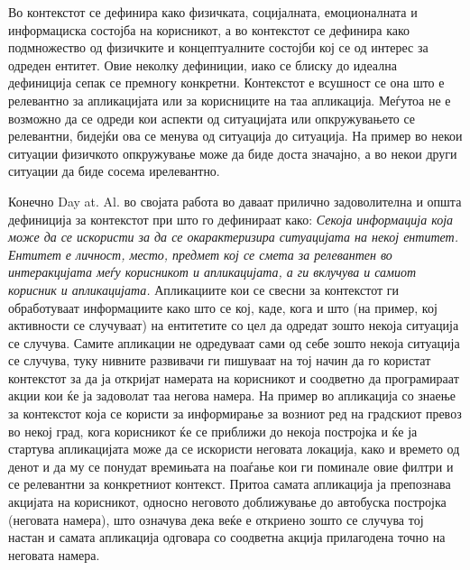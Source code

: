Во \cite{dey1998context} контекстот се дефинира како физичката, социјалната,
емоционалната и информациска состојба на корисникот, а во
\cite{pascoe1998adding} контекстот се дефинира како подмножество од физичките и
концептуалните состојби кој се од интерес за одреден ентитет. Овие неколку
дефиниции, иако се блиску до идеална дефиниција сепак се премногу конкретни.
Контекстот е всушност се она што е релевантно за апликацијата или за корисниците
на таа апликација. Меѓутоа не е возможно да се одреди кои аспекти од ситуацијата
или опкружувањето се релевантни, бидејќи ова се менува од ситуација до
ситуација. На пример во некои ситуации физичкото опкружување може да биде доста
значајно, а во некои други ситуации да биде сосема ирелевантно.

Конечно Day at. Al. во својата работа во
\cite{dey2000towards,dey2001understanding} даваат прилично задоволителна и општа
дефиниција за контекстот при што го дефинираат како:
\vfill
\emph{Секоја информација која може да се искористи за да се окарактеризира ситуацијата
на некој ентитет. Ентитет е личност, место, предмет кој се смета за релевантен
во интеракцијата меѓу корисникот и апликацијата, а ги вклучува и самиот корисник
и апликацијата.}
\vfill
Апликациите кои се свесни за контекстот ги обработуваат информациите како што се
кој, каде, кога и што (на пример, кој активности се случуваат) на ентитетите со
цел да одредат зошто некоја ситуација се случува. Самите апликации не одредуваат
сами од себе зошто некоја ситуација се случува, туку нивните развивачи ги
пишуваат на тој начин да го користат контекстот за да ја откријат намерата на
корисникот и соодветно да програмираат акции кои ќе ја задоволат таа негова
намера. На пример во апликација со знаење за контекстот која се користи за
информирање за возниот ред на градскиот превоз во некој град, кога корисникот ќе
се приближи до некоја постројка и ќе ја стартува апликацијата може да се
искористи неговата локација, како и времето од денот и да му се понудат
времињата на поаѓање кои ги поминале овие филтри и се релевантни за конкретниот
контекст. Притоа самата апликација ја препознава акцијата на корисникот, односно
неговото доближување до автобуска постројка (неговата намера), што означува дека
веќе е откриено зошто се случува тој настан и самата апликација одговара со
соодветна акција прилагодена точно на неговата намера.

